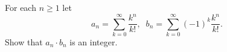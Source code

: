 For each $n\geq 1$ let
$$a_{n}=\sum_{k=0}^{\infty}\frac{k^{n}}{k!}, \;\; b_{n}=\sum_{k=0}^{\infty}(-1)^{k}\frac{k^{n}}{k!}.$$Show that $a_{n}\cdot b_{n}$ is an integer.